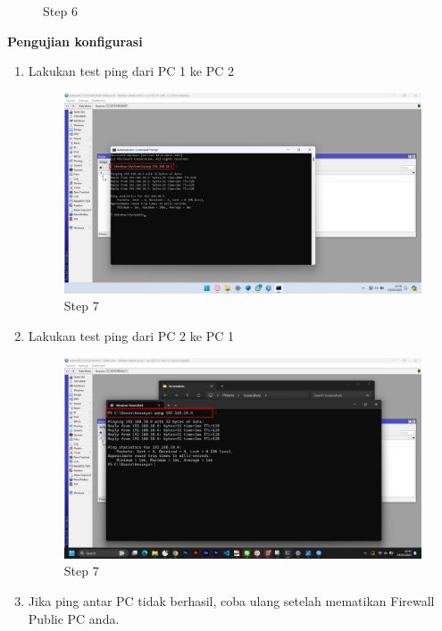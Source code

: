\begin{center}
\begin{enumerate}
\begin{figure}[H]
			\caption{Step 6}
			\label{fig:Step 6(Per.3 PC2)}
		\end{figure}
	\end{enumerate}

	\textbf{Pengujian konfigurasi}
	\begin{enumerate}
		\item Lakukan test ping dari PC 1 ke PC 2
		\begin{figure}[H]
			\centering
			\includegraphics[width=0.9\linewidth]{P1/img/per3/pc1/Step 7.png}
			\caption{Step 7}
			\label{fig:Step 7(Per.3 PC1)}
		\end{figure}
		\item Lakukan test ping dari PC 2 ke PC 1
		\begin{figure}[H]
			\centering
			\includegraphics[width=0.9\linewidth]{P1/img/per3/pc2/Step 7.png}
			\caption{Step 7}
			\label{fig:Step 7(Per.3 PC2)}
		\end{figure}
		\item Jika ping antar PC tidak berhasil, coba ulang setelah mematikan Firewall Public PC anda.
	\end{enumerate}
\end{center}

